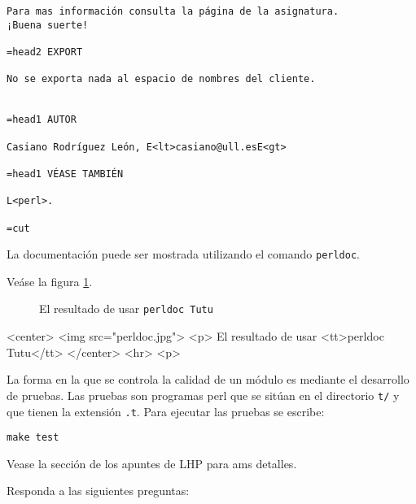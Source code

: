 \begin{verbatim}
Para mas información consulta la página de la asignatura.
¡Buena suerte!

=head2 EXPORT

No se exporta nada al espacio de nombres del cliente.


=head1 AUTOR

Casiano Rodríguez León, E<lt>casiano@ull.esE<gt>

=head1 VÉASE TAMBIÉN

L<perl>.

=cut
\end{verbatim}
La documentación puede ser mostrada utilizando el comando \verb|perldoc|.

\begin{latexonly}
Veáse la figura \ref{fig:perldoc}.

\begin{figure}[htb]
\centerline{}
\caption{El resultado de usar {\tt perldoc Tutu}}
\label{fig:perldoc}
\end{figure}
\end{latexonly}

\begin{rawhtml}
<center>
<img src="perldoc.jpg">
<p>
El resultado de usar <tt>perldoc Tutu</tt>
</center>
<hr>
<p>
\end{rawhtml}


La forma en la que se controla la calidad de un módulo es mediante 
el desarrollo de pruebas. Las pruebas son programas perl que se sitúan en el directorio
\verb|t/| y que tienen la extensión \verb|.t|. Para ejecutar las pruebas
se escribe:

\begin{verbatim}
make test
\end{verbatim}

Vease la sección  de los apuntes de LHP para ams detalles.

\label{repaso:lasbases}

Responda a las siguientes preguntas:

